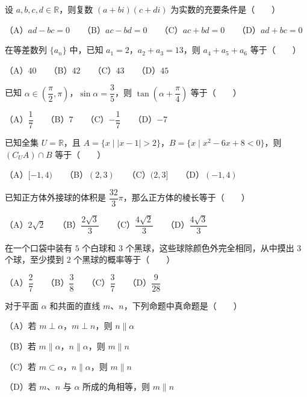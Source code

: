 \begin{question}
设 $a,b,c,d\in\mathbb R$，则复数 $(a+bi)(c+di)$ 为实数的充要条件是\mbox{（　　）}

（A）$ad-bc=0$　　（B）$ac-bd=0$　　（C）$ac+bd=0$　　（D）$ad+bc=0$

\end{question}
\begin{question}
在等差数列 $\{a_n\}$ 中，已知 $a_1=2$，$a_2+a_3=13$，则 $a_4+a_5+a_6$ 等于\mbox{（　　）}

（A）$40$　　（B）$42$　　（C）$43$　　（D）$45$

\end{question}
\begin{question}
已知 $\alpha\in\left(\dfrac{\pi}{2},\pi\right)$，$\sin\alpha=\dfrac35$，则 $\tan\left(\alpha+\dfrac\pi4\right)$ 等于\mbox{（　　）}

（A）$\dfrac17$　　（B）$7$　　（C）$-\dfrac17$　　（D）$-7$

\end{question}
\begin{question}
已知全集 $U=\mathbb R$，且 $A=\{x\mid |x-1|>2\}$，$B=\{x\mid x^2-6x+8<0\}$，则 $(C_U A)\cap B$ 等于\mbox{（　　）}

（A）$[-1,4)$　　（B）$(2,3)$　　（C）$(2,3]$　　（D）$(-1,4)$

\end{question}
\begin{question}
已知正方体外接球的体积是 $\dfrac{32}{3}\pi$，那么正方体的棱长等于\mbox{（　　）}

（A）$2\sqrt2$　　（B）$\dfrac{2\sqrt3}{3}$　　（C）$\dfrac{4\sqrt2}{3}$　　（D）$\dfrac{4\sqrt3}{3}$

\end{question}
\begin{question}
在一个口袋中装有 $5$ 个白球和 $3$ 个黑球，这些球除颜色外完全相同，从中摸出 $3$ 个球，至少摸到 $2$ 个黑球的概率等于\mbox{（　　）}

（A）$\dfrac27$　　（B）$\dfrac38$　　（C）$\dfrac37$　　（D）$\dfrac9{28}$

\end{question}
\begin{question}
对于平面 $\alpha$ 和共面的直线 $m$、$n$，下列命题中真命题是\mbox{（　　）}

（A）若 $m\perp\alpha$，$m\perp n$，则 $n\parallel\alpha$

（B）若 $m\parallel\alpha$，$n\parallel\alpha$，则 $m\parallel n$

（C）若 $m\subset\alpha$，$n\parallel\alpha$，则 $m\parallel n$

（D）若 $m$、$n$ 与 $\alpha$ 所成的角相等，则 $m\parallel n$

\end{question}
